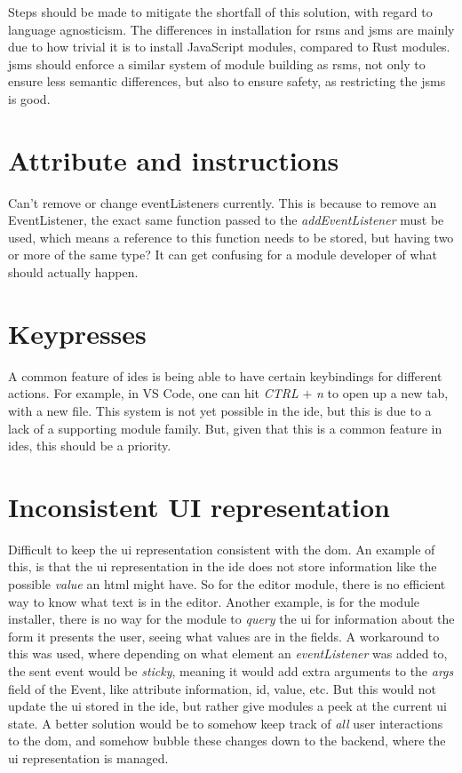 Steps should be made to mitigate the shortfall of this solution, with regard to
language agnosticism. The differences in installation for \gls*{rsms} and
\gls*{jsms} are mainly due to how trivial it is to install JavaScript modules,
compared to Rust modules. \gls*{jsms} should enforce a similar system of module
building as \gls*{rsms}, not only to ensure less semantic differences, but also
to ensure safety, as restricting the \gls*{jsms} is good.

\section{Attribute and instructions}

Can't remove or change eventListeners currently. This is because to remove an
EventListener, the exact same function passed to the \textit{addEventListener}
must be used, which means a reference to this function needs to be stored, but
having two or more of the same type? It can get confusing for a module developer
of what should actually happen.

\section{Keypresses}

A common feature of \gls*{ide}s is being able to have certain keybindings for
different actions. For example, in VS Code, one can hit \textit{CTRL}
$+$ \textit{n} to open up a new tab, with a new file. This system is not yet
possible in the \gls*{ide}, but this is due to a lack of a supporting module
family. But, given that this is a common feature in \gls*{ide}s, this should be
a priority.


\section{Inconsistent UI representation}

Difficult to keep the \gls*{ui} representation consistent with the \gls*{dom}.
An example of this, is that the \gls*{ui} representation in the \gls*{ide} does
not store information like the possible \textit{value} an \gls{html} might
have. So for the editor module, there is no efficient way to know what text is
in the editor. Another example, is for the module installer, there is no way for
the module to \textit{query} the \gls*{ui} for information about the form it
presents the user, seeing what values are in the fields. A workaround to this
was used, where depending on what element an \textit{eventListener} was added
to, the sent event would be \textit{sticky}, meaning it would add extra
arguments to the \textit{args} field of the Event, like attribute information,
id, value, etc. But this would not update the \gls*{ui} stored in the
\gls*{ide}, but rather give modules a peek at the current \gls*{ui} state. A
better solution would be to somehow keep track of \textit{all} user interactions
to the \gls*{dom}, and somehow bubble these changes down to the backend, where
the \gls*{ui} representation is managed.


